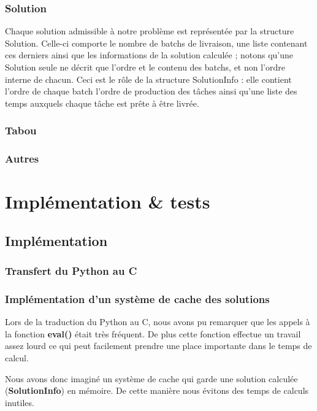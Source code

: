 \documentclass[hideweeklyreports]{polytech/polytech}
\begin{document}
			\subsection{Solution}
				Chaque solution admissible à notre problème est représentée par la structure Solution. Celle-ci comporte le nombre de batchs de livraison, une liste contenant ces derniers ainsi que les informations de la solution calculée ; notons qu'une Solution seule ne décrit que l'ordre et le contenu des batchs, et non l'ordre interne de chacun. Ceci est le rôle de la structure SolutionInfo : elle contient l'ordre de chaque batch l'ordre de production des tâches ainsi qu'une liste des temps auxquels chaque tâche est prête à être livrée.
				
			\subsection{Tabou}
				
			\subsection{Autres}
		
	\chapter{Implémentation \& tests} %
		\section{Implémentation} %
			\subsection{Transfert du Python au C} %
			\subsection{Implémentation d'un système de cache des solutions}
				Lors de la traduction du Python au C, nous avons pu remarquer que les appels à la fonction \textbf{eval()} était très fréquent. De plus cette fonction effectue un travail assez lourd ce qui peut facilement prendre une place importante dans le temps de calcul.
				
				Nous avons donc imaginé un système de cache qui garde une solution calculée (\textbf{SolutionInfo}) en mémoire. De cette manière nous évitons des temps de calculs inutiles.
				
\end{document}
